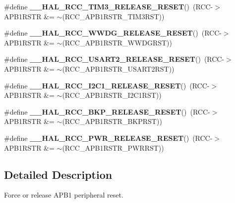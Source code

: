 \begin{DoxyCompactItemize}
\item 
\mbox{\label{group___r_c_c___a_p_b1___force___release___reset_ga27cf9c39217fff6ae9bce2285d9aff8c}} 
\#define {\bfseries \+\_\+\+\_\+\+H\+A\+L\+\_\+\+R\+C\+C\+\_\+\+T\+I\+M3\+\_\+\+R\+E\+L\+E\+A\+S\+E\+\_\+\+R\+E\+S\+ET}()~(R\+CC-\/$>$A\+P\+B1\+R\+S\+TR \&= $\sim$(R\+C\+C\+\_\+\+A\+P\+B1\+R\+S\+T\+R\+\_\+\+T\+I\+M3\+R\+ST))
\item 
\mbox{\label{group___r_c_c___a_p_b1___force___release___reset_ga63fa37b173c2c1d9249389148f96e5f1}} 
\#define {\bfseries \+\_\+\+\_\+\+H\+A\+L\+\_\+\+R\+C\+C\+\_\+\+W\+W\+D\+G\+\_\+\+R\+E\+L\+E\+A\+S\+E\+\_\+\+R\+E\+S\+ET}()~(R\+CC-\/$>$A\+P\+B1\+R\+S\+TR \&= $\sim$(R\+C\+C\+\_\+\+A\+P\+B1\+R\+S\+T\+R\+\_\+\+W\+W\+D\+G\+R\+ST))
\item 
\mbox{\label{group___r_c_c___a_p_b1___force___release___reset_ga8baebf28a2739de5f3c5ef72519b9499}} 
\#define {\bfseries \+\_\+\+\_\+\+H\+A\+L\+\_\+\+R\+C\+C\+\_\+\+U\+S\+A\+R\+T2\+\_\+\+R\+E\+L\+E\+A\+S\+E\+\_\+\+R\+E\+S\+ET}()~(R\+CC-\/$>$A\+P\+B1\+R\+S\+TR \&= $\sim$(R\+C\+C\+\_\+\+A\+P\+B1\+R\+S\+T\+R\+\_\+\+U\+S\+A\+R\+T2\+R\+ST))
\item 
\mbox{\label{group___r_c_c___a_p_b1___force___release___reset_ga87cc8c2107c1d0820cc1f7e2aeb1aeb9}} 
\#define {\bfseries \+\_\+\+\_\+\+H\+A\+L\+\_\+\+R\+C\+C\+\_\+\+I2\+C1\+\_\+\+R\+E\+L\+E\+A\+S\+E\+\_\+\+R\+E\+S\+ET}()~(R\+CC-\/$>$A\+P\+B1\+R\+S\+TR \&= $\sim$(R\+C\+C\+\_\+\+A\+P\+B1\+R\+S\+T\+R\+\_\+\+I2\+C1\+R\+ST))
\item 
\mbox{\label{group___r_c_c___a_p_b1___force___release___reset_ga7e15730f81926cd9c8b1c637465c1b77}} 
\#define {\bfseries \+\_\+\+\_\+\+H\+A\+L\+\_\+\+R\+C\+C\+\_\+\+B\+K\+P\+\_\+\+R\+E\+L\+E\+A\+S\+E\+\_\+\+R\+E\+S\+ET}()~(R\+CC-\/$>$A\+P\+B1\+R\+S\+TR \&= $\sim$(R\+C\+C\+\_\+\+A\+P\+B1\+R\+S\+T\+R\+\_\+\+B\+K\+P\+R\+ST))
\item 
\mbox{\label{group___r_c_c___a_p_b1___force___release___reset_gaaa5a340d38d50e508243f48bbb47dd32}} 
\#define {\bfseries \+\_\+\+\_\+\+H\+A\+L\+\_\+\+R\+C\+C\+\_\+\+P\+W\+R\+\_\+\+R\+E\+L\+E\+A\+S\+E\+\_\+\+R\+E\+S\+ET}()~(R\+CC-\/$>$A\+P\+B1\+R\+S\+TR \&= $\sim$(R\+C\+C\+\_\+\+A\+P\+B1\+R\+S\+T\+R\+\_\+\+P\+W\+R\+R\+ST))
\end{DoxyCompactItemize}


\subsection{Detailed Description}
Force or release A\+P\+B1 peripheral reset. 

